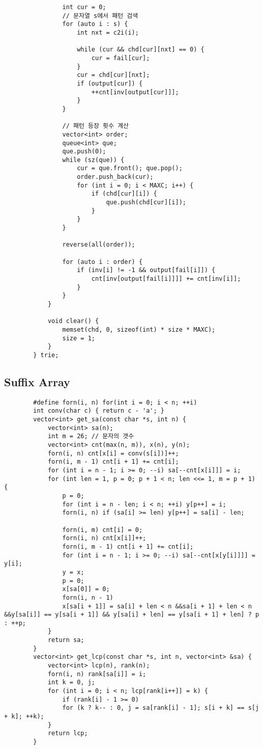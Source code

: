 \documentclass[landscape, 8pt, a4paper, oneside, twocolumn]{extarticle}
\begin{document}
\begin{verbatim}
				int cur = 0;
				// 문자열 s에서 패턴 검색
				for (auto i : s) {
					int nxt = c2i(i);
					
					while (cur && chd[cur][nxt] == 0) {
						cur = fail[cur];
					}
					cur = chd[cur][nxt];
					if (output[cur]) {
						++cnt[inv[output[cur]]];
					}
				}
				
				// 패턴 등장 횟수 계산
				vector<int> order;
				queue<int> que;
				que.push(0);
				while (sz(que)) {
					cur = que.front(); que.pop();
					order.push_back(cur);
					for (int i = 0; i < MAXC; i++) {
						if (chd[cur][i]) {
							que.push(chd[cur][i]);
						}
					}
				}
				
				reverse(all(order));
				
				for (auto i : order) {
					if (inv[i] != -1 && output[fail[i]]) {
						cnt[inv[output[fail[i]]]] += cnt[inv[i]];
					}
				}
			}
			
			void clear() {
				memset(chd, 0, sizeof(int) * size * MAXC);
				size = 1;
			}
		} trie;
	\end{verbatim}
	\subsection{Suffix Array}
	\begin{verbatim}
		#define forn(i, n) for(int i = 0; i < n; ++i)
		int conv(char c) { return c - 'a'; }
		vector<int> get_sa(const char *s, int n) {
			vector<int> sa(n);
			int m = 26; // 문자의 갯수
			vector<int> cnt(max(n, m)), x(n), y(n);
			forn(i, n) cnt[x[i] = conv(s[i])]++;
			forn(i, m - 1) cnt[i + 1] += cnt[i];
			for (int i = n - 1; i >= 0; --i) sa[--cnt[x[i]]] = i;
			for (int len = 1, p = 0; p + 1 < n; len <<= 1, m = p + 1) {
				p = 0;
				for (int i = n - len; i < n; ++i) y[p++] = i;
				forn(i, n) if (sa[i] >= len) y[p++] = sa[i] - len;
				
				forn(i, m) cnt[i] = 0;
				forn(i, n) cnt[x[i]]++;
				forn(i, m - 1) cnt[i + 1] += cnt[i];
				for (int i = n - 1; i >= 0; --i) sa[--cnt[x[y[i]]]] = y[i];
				y = x;
				p = 0;
				x[sa[0]] = 0;
				forn(i, n - 1)
				x[sa[i + 1]] = sa[i] + len < n &&sa[i + 1] + len < n &&y[sa[i]] == y[sa[i + 1]] && y[sa[i] + len] == y[sa[i + 1] + len] ? p : ++p;
			}
			return sa;
		}
		vector<int> get_lcp(const char *s, int n, vector<int> &sa) {
			vector<int> lcp(n), rank(n);
			forn(i, n) rank[sa[i]] = i;
			int k = 0, j;
			for (int i = 0; i < n; lcp[rank[i++]] = k) {
				if (rank[i] - 1 >= 0)
				for (k ? k-- : 0, j = sa[rank[i] - 1]; s[i + k] == s[j + k]; ++k);
			}
			return lcp;
		}
	\end{verbatim}
\end{document}
